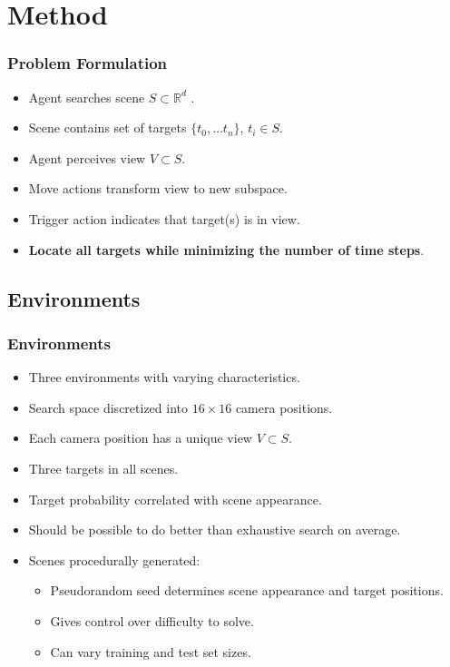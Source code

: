 \section{Method}

\begin{frame}
    \frametitle{Problem Formulation}

    \begin{itemize}
        \item Agent searches scene \(S \subset \mathbb{R}^d\) .
        \item Scene contains set of targets \(\{t_0, \dots t_n\}\), \(t_i \in S\).
        \item Agent perceives view \(V \subset S\).
        \item Move actions transform view to new subspace.
        \item Trigger action indicates that target(s) is in view.
        \item \textbf{Locate all targets while minimizing the number of time steps}.
    \end{itemize}
\end{frame}

\subsection{Environments}

\begin{frame}
    \frametitle{Environments}
    
    \begin{itemize}
        \item Three environments with varying characteristics.
        \item Search space discretized into \(16 \times 16\) camera positions.
        \item Each camera position has a unique view \(V \subset S\).
        \item Three targets in all scenes.
        \item Target probability correlated with scene appearance.
        \item Should be possible to do better than exhaustive search on average.
        \item Scenes procedurally generated:
        \begin{itemize}
            \item Pseudorandom seed determines scene appearance and target positions.
            \item Gives control over difficulty to solve.
            \item Can vary training and test set sizes.
        \end{itemize}
    \end{itemize}
\end{frame}

